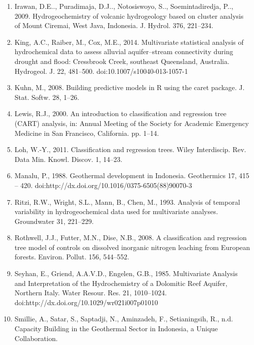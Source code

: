 \documentclass{sciposter}
\begin{document}
\begin{multicols}{3}
\begin{enumerate}
\item Irawan, D.E.., Puradimaja, D.J.., Notosiswoyo, S.., Soemintadiredja, P.., 2009. Hydrogeochemistry of volcanic hydrogeology based on cluster analysis of Mount Ciremai, West Java, Indonesia. J. Hydrol. 376, 221–234.

\item King, A.C., Raiber, M., Cox, M.E., 2014. Multivariate statistical analysis of hydrochemical data to assess alluvial aquifer–stream connectivity during drought and flood: Cressbrook Creek, southeast Queensland, Australia. Hydrogeol. J. 22, 481–500. doi:10.1007/s10040-013-1057-1

\item Kuhn, M., 2008. Building predictive models in R using the caret package. J. Stat. Softw. 28, 1–26.

\item Lewis, R.J., 2000. An introduction to classification and regression tree (CART) analysis, in: Annual Meeting of the Society for Academic Emergency Medicine in San Francisco, California. pp. 1–14.

\item Loh, W.-Y., 2011. Classification and regression trees. Wiley Interdiscip. Rev. Data Min. Knowl. Discov. 1, 14–23.

\item Manalu, P., 1988. Geothermal development in Indonesia. Geothermics 17, 415 – 420. doi:http://dx.doi.org/10.1016/0375-6505(88)90070-3

\item Ritzi, R.W., Wright, S.L., Mann, B., Chen, M., 1993. Analysis of temporal variability in hydrogeochemical data used for multivariate analyses. Groundwater 31, 221–229.

\item Rothwell, J.J., Futter, M.N., Dise, N.B., 2008. A classification and regression tree model of controls on dissolved inorganic nitrogen leaching from European forests. Environ. Pollut. 156, 544–552.

\item Seyhan, E., Griend, A.A.V.D., Engelen, G.B., 1985. Multivariate Analysis and Interpretation of the Hydrochemistry of a Dolomitic Reef Aquifer, Northern Italy. Water Resour. Res. 21, 1010–1024. doi:http://dx.doi.org/10.1029/wr021i007p01010

\item Smillie, A., Satar, S., Saptadji, N., Aminzadeh, F., Setianingsih, R., n.d. Capacity Building in the Geothermal Sector in Indonesia, a Unique Collaboration.


\end{enumerate}
\end{multicols}
\end{document}
